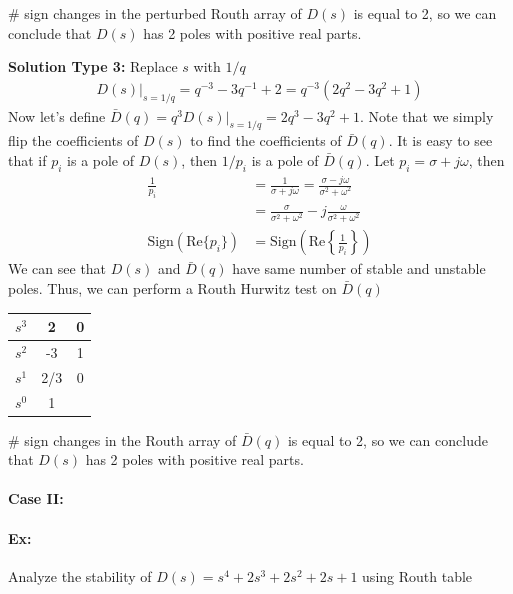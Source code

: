 \documentclass[twoside]{article}
\begin{document}
$\#$ sign changes in the perturbed Routh array of $D(s)$ is equal to 2, so
we can conclude that $D(s)$ has 2 poles with positive real parts.

\newpage

\textbf{Solution Type 3:} Replace $s$ with $1/q$
%
\begin{align*}
  D(s)|_{s =1/q} = q^{-3} - 3 q^{-1} + 2 = q^{-3} 
  \left( 2 q^{2} - 3 q^2 + 1 \right)
\end{align*}
%
Now let's define $\bar{D}(q) = q^3 D(s)|_{s =1/q} =  2 q^3 - 3 q^2 +
1$. 
Note that we simply flip the coefficients of $D(s)$
to find the coefficients of $\bar{D}(q)$. It is easy to see that 
if $p_i$ is a pole of $D(s)$, then $1/p_i$ is a pole of $\bar{D}(q)$.
Let $p_i = \sigma + j \omega$, then 
%
\begin{align*}
  \frac{1}{p_i} &= \frac{1}{\sigma + j \omega} = \frac{\sigma - j
  \omega}{\sigma^2 + \omega^2}
\\
&= \frac{\sigma}{\sigma^2 + \omega^2} - j \frac{
  \omega}{\sigma^2 + \omega^2}
\\
\mathrm{Sign} ( \mathrm{Re} \lbrace p_i \rbrace ) &= 
\mathrm{Sign} \left( \mathrm{Re} \left\lbrace \frac{1}{p_i} \right\rbrace \right)
\end{align*}
%
We can see that $D(s)$ and $\bar{D}(q)$ have same number of stable
and unstable poles. Thus, we can perform a Routh Hurwitz test on
$\bar{D}(q)$
%
\begin{table}[h]
\begin{center}
\begin{tabular}{|c || c || c  |}
\hline
$s^3$ & 2 & 0 
\\ \hline
$s^2$ & -3 & 1
\\ \hline
$s^1$  & 2/3 & 0 
\\ \hline
$s^0$  & 1 & 
\\ \hline
\end{tabular}
\end{center}
\end{table}

$\#$ sign changes in the Routh array of $\bar{D}(q)$ is equal to 2, so
we can conclude that $D(s)$ has 2 poles with positive real parts.

\paragraph{Case II:}

\paragraph{Ex:} Analyze the stability of $D(s) = s^4 + 2 s^3 + 2 s^2 +
2 s + 1$ using Routh table
\end{document}
